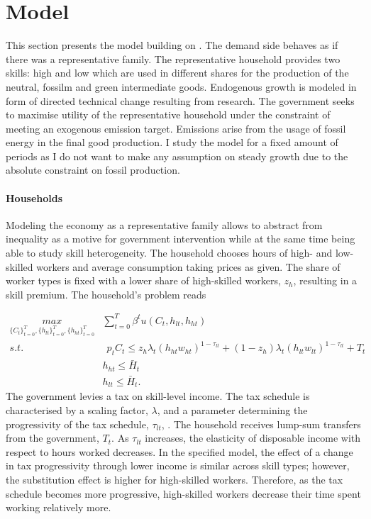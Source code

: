 
\section{Model}\label{sec:model}
This section presents the model building on \cite{Fried2018ClimateAnalysis}. 
The demand side behaves as if there was a representative family.  The representative household provides two skills: high and low which are used in different shares for the production of the neutral, fossilm and green intermediate goods.
Endogenous growth is modeled in form of directed technical change resulting from research. The government seeks to maximise utility of the representative household under the constraint of meeting an exogenous emission target. Emissions arise from the usage of fossil energy in the final good production. 
I study the model for a fixed amount of periods as I do not want to make any assumption on steady growth due to the absolute constraint on fossil production. 

\paragraph{Households}
Modeling the economy as a representative family allows to abstract from inequality as a motive for government intervention while at the same time being able to study skill heterogeneity.
 The household chooses hours of high- and low-skilled workers and average consumption taking prices as given. The share of worker types is fixed with a lower share of high-skilled workers, $z_h$, resulting in a skill premium. The household's problem reads

\begin{align}
\underset{\{C_{t}\}_{t=0}^{T}, \{h_{lt}\}_{t=0}^{T}, \{h_{ht}\}_{t=0}^{T}}{max}&
\sum_{t=0}^{T}\beta^t u(C_{t}, h_{lt}, h_{ht})\\
s.t.& \ \ p_{t}C_{t}\leq%
z_h\lambda_t \left(h_{ht}w_{ht}\right)^{1-\tau_{lt}}+(1-z_h)\lambda_t\left(h_{lt}w_{lt}\right)^{1-\tau_{lt}}+T_t\\
\ & h_{ht}\leq \bar{H}_t\\
\ & h_{lt}\leq \bar{H}_t.
\end{align}
The government levies a tax on skill-level income. The tax schedule is characterised by  a scaling factor, $\lambda$, and a parameter determining the progressivity of the tax schedule, $\tau_{lt}$, \citep[compare, e.g.,][]{Heathcote2017OptimalFramework}. The household receives lump-sum transfers from the government, $T_t$.  As $\tau_{lt}$ increases, the elasticity of disposable income with respect to hours worked decreases. In the specified model, the effect of a change in tax progressivity through lower income is similar across skill types; however, the substitution effect is higher for high-skilled workers. Therefore, as the tax schedule becomes more progressive, high-skilled workers decrease their time spent working relatively more.

